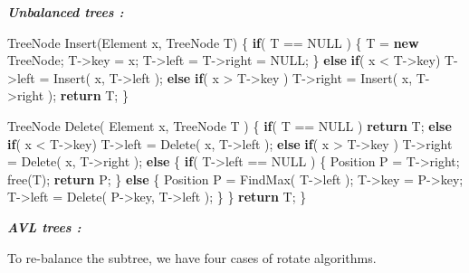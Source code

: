 \documentclass[]{article}
\newenvironment{Shaded}{}{}
\newcommand{\KeywordTok}[1]{\textcolor[rgb]{0.00,0.44,0.13}{\textbf{#1}}}
\newcommand{\ControlFlowTok}[1]{\textcolor[rgb]{0.00,0.44,0.13}{\textbf{#1}}}
\newcommand{\NormalTok}[1]{#1}
\begin{document}
\textbf{\emph{Unbalanced trees :}}

\begin{Shaded}
\begin{Highlighting}[]
\NormalTok{TreeNode Insert(Element x, TreeNode T)}
\NormalTok{\{}
    \ControlFlowTok{if}\NormalTok{( T == NULL )}
\NormalTok{    \{}
\NormalTok{        T = }\KeywordTok{new}\NormalTok{ TreeNode;}
\NormalTok{        T->key = x;}
\NormalTok{        T->left = T->right = NULL;}
\NormalTok{    \}}
    \ControlFlowTok{else} \ControlFlowTok{if}\NormalTok{( x < T->key)}
\NormalTok{            T->left = Insert( x, T->left );}
    \ControlFlowTok{else} \ControlFlowTok{if}\NormalTok{( x > T->key )}
\NormalTok{                T->right = Insert( x, T->right );}
    \ControlFlowTok{return}\NormalTok{ T;}
\NormalTok{\}}


\NormalTok{TreeNode Delete( Element x, TreeNode T )}
\NormalTok{\{}
    \ControlFlowTok{if}\NormalTok{( T == NULL )  }
        \ControlFlowTok{return}\NormalTok{ T;}
    \ControlFlowTok{else} \ControlFlowTok{if}\NormalTok{( x < T->key) }
\NormalTok{            T->left = Delete( x, T->left );}
    \ControlFlowTok{else} \ControlFlowTok{if}\NormalTok{( x > T->key )}
\NormalTok{            T->right = Delete( x, T->right );}
    \ControlFlowTok{else}  
\NormalTok{        \{}
            \ControlFlowTok{if}\NormalTok{( T->left == NULL )}
\NormalTok{            \{}
\NormalTok{            	Position P = T->right;}
\NormalTok{            	free(T);}
            	\ControlFlowTok{return}\NormalTok{ P;   }
\NormalTok{            \}}
            \ControlFlowTok{else}
\NormalTok{            \{}
\NormalTok{            	Position P = FindMax( T->left );}
\NormalTok{            	T->key = P->key;}
\NormalTok{            	T->left = Delete( P->key, T->left );}
\NormalTok{            \}}
\NormalTok{        \}}
    \ControlFlowTok{return}\NormalTok{ T;}
\NormalTok{\}}
\end{Highlighting}
\end{Shaded}

\textbf{\emph{AVL trees :}}

 To re-balance the subtree, we have four cases of rotate algorithms.
\end{document}
